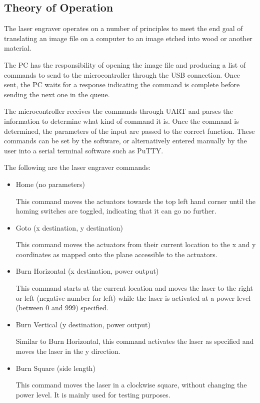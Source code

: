 \documentclass[11pt]{LaTeX-Classes/math-hw}
\begin{document}
\subsection{Theory of Operation}
The laser engraver operates on a number of principles to meet the end goal of
translating an image file on a computer to an image etched into wood or another material.

The PC has the responsibility of opening the image file and producing a list of commands to send to the microcontroller through the
USB connection. Once sent, the PC waits for a response indicating the command is complete
before sending the next one in the queue.

The microcontroller receives the commands through UART and parses the information to determine
what kind of command it is.  Once the command is determined, the parameters of the input are passed to the correct function.
These commands can be set by the software, or alternatively entered manually by the user
into a serial terminal software such as PuTTY.

The following are the laser engraver commands:
\begin{itemize}
  \item Home (no parameters)

    This command moves the actuators towards the top left hand corner until the homing switches
    are toggled, indicating that it can go no further.

  \item Goto (x destination, y destination)
    
    This command moves the actuators from their current location to the x and y coordinates
    as mapped onto the plane accessible to the actuators.

  \item Burn Horizontal (x destination, power output)

    This command starts at the current location and moves the laser to the right or left (negative number for left)
    while the laser is activated at a power level (between 0 and 999) specified.

  \item Burn Vertical (y destination, power output)
    
    Similar to Burn Horizontal, this command activates the laser as specified and moves the laser in the
    y direction.

  \item Burn Square (side length)

    This command moves the laser in a clockwise square, without changing the power level. It is
    mainly used for testing purposes.
\end{itemize}
\end{document}
